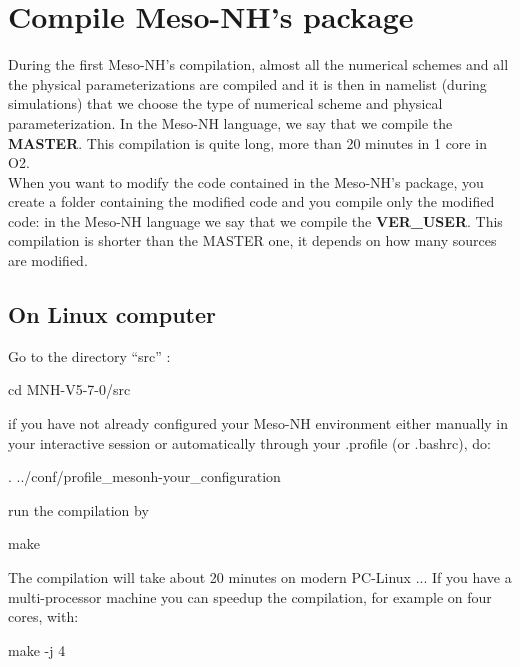 \section{Compile Meso-NH's package}
\label{sec:compile_mesonh_package}

During the first Meso-NH's compilation, almost all the numerical schemes and all the physical parameterizations are compiled and it is then in namelist (during simulations) that we choose the type of numerical scheme and physical parameterization. In the Meso-NH language, we say that we compile the \textbf{MASTER}. This compilation is quite long, more than 20 minutes in 1 core in O2. \\

When you want to modify the code contained in the Meso-NH's package, you create a folder containing the modified code and you compile only the modified code: in the Meso-NH language we say that we compile the \textbf{VER\_USER}. This compilation is shorter than the MASTER one, it depends on how many sources are modified.

\subsection{On Linux computer}

Go to the directory ``src'' :
\begin{bashcode}
cd  MNH-V5-7-0/src
\end{bashcode}

if you have not already configured your Meso-NH environment either manually in your interactive session or automatically through your .profile (or .bashrc), do:
\begin{bashcode}
. ../conf/profile_mesonh-your_configuration
\end{bashcode}

run the compilation by
\begin{bashcode}
make
\end{bashcode}

The compilation will take about 20 minutes on modern PC-Linux ... If you have a multi-processor machine you can speedup the compilation, for example on four cores, with:
\begin{bashcode}
make -j 4
\end{bashcode}

